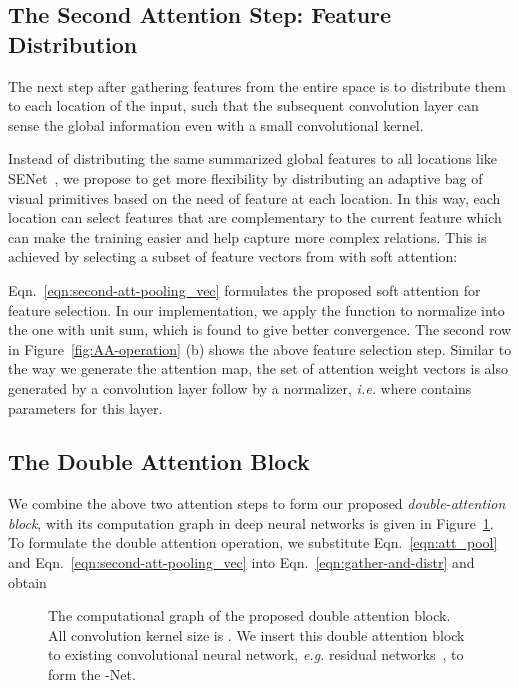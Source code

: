 \documentclass{article}
\begin{document}
\subsection{The Second Attention Step: Feature Distribution}

The next step after gathering features from the entire space is to distribute them to each  location of the input, such that the subsequent convolution layer can sense the global information even with a small convolutional kernel. 

Instead of distributing the same summarized global features to all locations like SENet~\cite{hu2017}, we propose to get more flexibility by distributing an adaptive bag of visual primitives based on the need of feature  at each location. In this way, each location can select features that are complementary to the current feature which can make the training easier and help capture more complex relations. This is achieved by selecting a subset of feature vectors from  with soft attention:

Eqn.~\eqref{eqn:second-att-pooling_vec} formulates the proposed soft attention for feature selection. In our implementation, we apply  the  function to normalize   into the one with unit sum, which is found to give better convergence. The second row in Figure~\ref{fig:AA-operation} (b) shows the above feature selection step. Similar to the way we generate the attention map, the set of attention weight vectors is also generated by a convolution layer follow by a  normalizer, \emph{i.e.}  where  contains parameters for this layer.


\subsection{The Double Attention Block}
\label{subsec:double_att}
We combine the above two attention steps to form our proposed \emph{double-attention block}, with its computation graph in deep neural networks is given in Figure~\ref{fig:Implement_A^2_block}. 
To formulate the double attention operation, we substitute Eqn.~\eqref{eqn:att_pool} and Eqn.~\eqref{eqn:second-att-pooling_vec} into Eqn.~\eqref{eqn:gather-and-distr} and obtain


\begin{figure}
\centering
{}
\caption{The computational graph of the proposed double attention block. All convolution kernel size is . We insert this double attention block to existing convolutional neural network, \emph{e.g.} residual networks~\cite{he2016deep}, to form the -Net.}
\label{fig:Implement_A^2_block}
\end{figure}
\end{document}
